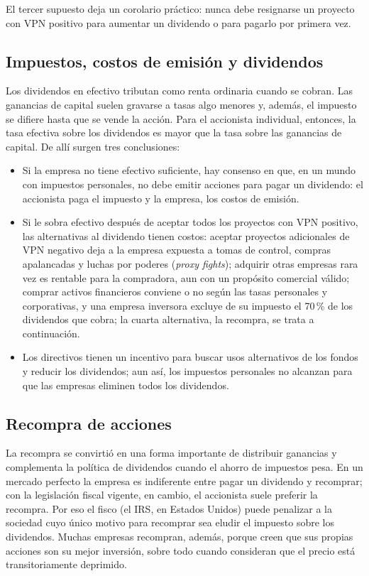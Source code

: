 El tercer supuesto deja un corolario práctico: nunca debe resignarse un proyecto con VPN positivo para aumentar un dividendo o para pagarlo por primera vez.

\subsection{Impuestos, costos de emisión y dividendos}

Los dividendos en efectivo tributan como renta ordinaria cuando se cobran. Las ganancias de capital suelen gravarse a tasas algo menores y, además, el impuesto se difiere hasta que se vende la acción. Para el accionista individual, entonces, la tasa efectiva sobre los dividendos es mayor que la tasa sobre las ganancias de capital. De allí surgen tres conclusiones:
\begin{itemize}
\item Si la empresa no tiene efectivo suficiente, hay consenso en que, en un mundo con impuestos personales, no debe emitir acciones para pagar un dividendo: el accionista paga el impuesto y la empresa, los costos de emisión.
\item Si le sobra efectivo después de aceptar todos los proyectos con VPN positivo, las alternativas al dividendo tienen costos: aceptar proyectos adicionales de VPN negativo deja a la empresa expuesta a tomas de control, compras apalancadas y luchas por poderes (\emph{proxy fights}); adquirir otras empresas rara vez es rentable para la compradora, aun con un propósito comercial válido; comprar activos financieros conviene o no según las tasas personales y corporativas, y una empresa inversora excluye de su impuesto el 70\,\% de los dividendos que cobra; la cuarta alternativa, la recompra, se trata a continuación.
\item Los directivos tienen un incentivo para buscar usos alternativos de los fondos y reducir los dividendos; aun así, los impuestos personales no alcanzan para que las empresas eliminen todos los dividendos.
\end{itemize}

\subsection{Recompra de acciones}

La recompra se convirtió en una forma importante de distribuir ganancias y complementa la política de dividendos cuando el ahorro de impuestos pesa. En un mercado perfecto la empresa es indiferente entre pagar un dividendo y recomprar; con la legislación fiscal vigente, en cambio, el accionista suele preferir la recompra. Por eso el fisco (el IRS, en Estados Unidos) puede penalizar a la sociedad cuyo único motivo para recomprar sea eludir el impuesto sobre los dividendos. Muchas empresas recompran, además, porque creen que sus propias acciones son su mejor inversión, sobre todo cuando consideran que el precio está transitoriamente deprimido.

